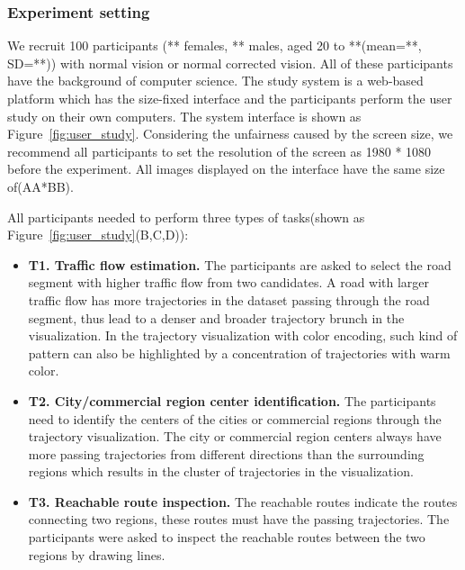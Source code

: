 \subsubsection{Experiment setting}

We recruit 100 participants (** females, ** males, aged 20 to **(mean=**, SD=**)) with normal vision or normal corrected vision. All of these participants have the background of computer science. 
The study system is a web-based platform which has the size-fixed interface and the participants perform the user study on their own  computers. The system interface is shown as Figure~\ref{fig:user_study}. Considering the unfairness caused by the screen size, we recommend all participants to set the resolution of the screen as 1980 * 1080 before the experiment. All images displayed on the interface have the same size of(AA*BB).  

All participants needed to perform three types of tasks(shown as Figure~\ref{fig:user_study}(B,C,D)):
\begin{itemize}[noitemsep]
	\item \textbf{T1. Traffic flow estimation.} 
	The participants are asked to select the road segment with higher traffic flow from two candidates.
	A road with larger traffic flow has more trajectories in the dataset passing through the road segment, thus lead to a denser and broader trajectory brunch in the visualization.  In the trajectory visualization with color encoding, such kind of pattern can also be highlighted by a concentration of trajectories with warm color.
	\item \textbf{T2. City/commercial region center identification.} The participants need to identify the centers of the cities or commercial regions through the trajectory visualization. The city or commercial region centers always have more passing trajectories from different directions than the surrounding regions which results in the   cluster of trajectories in the visualization.
	\item \textbf{T3. Reachable route inspection.} The reachable routes indicate the routes connecting two regions, these routes must have the passing trajectories. The participants were asked to inspect the reachable routes between the two regions by drawing lines. 
\end{itemize}

